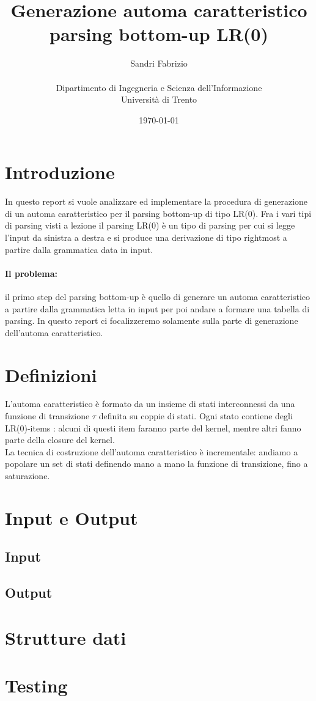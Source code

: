 \documentclass[12pt]{article}
\title{Generazione automa caratteristico parsing bottom-up LR(0) }
\author{
        Sandri Fabrizio \\ \\        
        Dipartimento di Ingegneria e Scienza dell'Informazione\\
        Università di Trento
}
\date{\today}
\begin{document}
\maketitle

\section{Introduzione}
In questo report si vuole analizzare ed implementare la procedura di generazione di un automa caratteristico per il parsing bottom-up di tipo LR(0). Fra i vari tipi di parsing visti a lezione il parsing LR(0) è un tipo di parsing per cui si legge l'input da sinistra a destra e si produce una derivazione di tipo rightmost a partire dalla grammatica data in input.

\paragraph{Il problema:} 
il primo step del parsing bottom-up è quello di generare un automa caratteristico a partire dalla grammatica letta in input per poi andare a formare una tabella di parsing. In questo report ci focalizzeremo solamente sulla parte di generazione dell'automa caratteristico.

\section{Definizioni}
L'automa caratteristico è formato da un insieme di stati interconnessi da una funzione di transizione $\tau$ definita su coppie di stati. Ogni stato contiene degli LR(0)-items : alcuni di questi item faranno parte del kernel, mentre altri fanno parte della closure del kernel.\\

La tecnica di costruzione dell'automa caratteristico è incrementale: andiamo a popolare un set di stati definendo mano a mano la funzione di transizione, fino a saturazione.


\section{Input e Output}

\subsection{Input}

\subsection{Output}

\section{Strutture dati}


\section{Testing}
\end{document}

